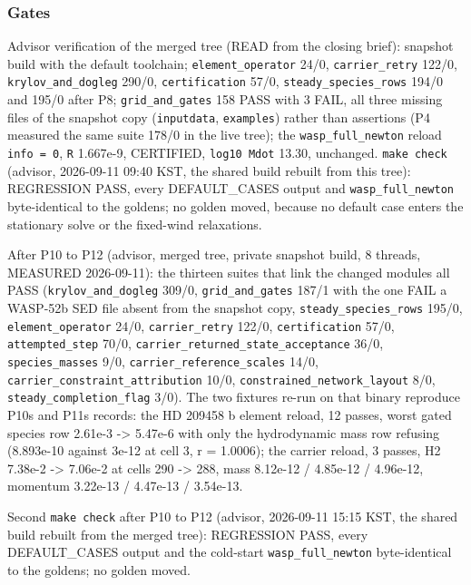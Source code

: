 \documentclass[english,a4paper]{my_memo}
\begin{document}
\subsubsection{Gates}\label{gates}

Advisor verification of the merged tree (READ from the closing brief):
snapshot build with the default toolchain; \texttt{element\_operator} 24/0,
\texttt{carrier\_retry} 122/0, \texttt{krylov\_and\_dogleg} 290/0, \texttt{certification} 57/0,
\texttt{steady\_species\_rows} 194/0 and 195/0 after P8; \texttt{grid\_and\_gates} 158 PASS
with 3 FAIL, all three missing files of the snapshot copy (\texttt{inputdata},
\texttt{examples}) rather than assertions (P4 measured the same suite 178/0 in the
live tree); the \texttt{wasp\_full\_newton} reload \texttt{info\ =\ 0}, \texttt{\textbar{}\textbar{}R\textbar{}\textbar{}} 1.667e-9,
CERTIFIED, \texttt{log10\ Mdot} 13.30, unchanged. \texttt{make\ check} (advisor, 2026-09-11 09:40 KST, the shared build rebuilt from this tree): REGRESSION PASS, every DEFAULT\_CASES output and \texttt{wasp\_full\_newton} byte-identical to the goldens; no golden moved, because no default case enters the stationary solve or the fixed-wind relaxations.

After P10 to P12 (advisor, merged tree, private snapshot build, 8 threads,
MEASURED 2026-09-11): the thirteen suites that link the changed modules all
PASS (\texttt{krylov\_and\_dogleg} 309/0, \texttt{grid\_and\_gates} 187/1 with the one FAIL a
WASP-52b SED file absent from the snapshot copy, \texttt{steady\_species\_rows} 195/0,
\texttt{element\_operator} 24/0, \texttt{carrier\_retry} 122/0, \texttt{certification} 57/0,
\texttt{attempted\_step} 70/0, \texttt{carrier\_returned\_state\_acceptance} 36/0,
\texttt{species\_masses} 9/0, \texttt{carrier\_reference\_scales} 14/0,
\texttt{carrier\_constraint\_attribution} 10/0, \texttt{constrained\_network\_layout} 8/0,
\texttt{steady\_completion\_flag} 3/0). The two fixtures re-run on that binary
reproduce P10\textquotesingle s and P11\textquotesingle s records: the HD 209458 b element reload, 12 passes,
worst gated species row 2.61e-3 -\textgreater{} 5.47e-6 with only the hydrodynamic mass
row refusing (8.893e-10 against 3e-12 at cell 3, r = 1.0006); the carrier
reload, 3 passes, H2 7.38e-2 -\textgreater{} 7.06e-2 at cells 290 -\textgreater{} 288, mass 8.12e-12 /
4.85e-12 / 4.96e-12, momentum 3.22e-13 / 4.47e-13 / 3.54e-13.

Second \texttt{make\ check} after P10 to P12 (advisor, 2026-09-11 15:15 KST, the shared build rebuilt from the merged tree): REGRESSION PASS, every DEFAULT\_CASES output and the cold-start \texttt{wasp\_full\_newton} byte-identical to the goldens; no golden moved.
\end{document}
